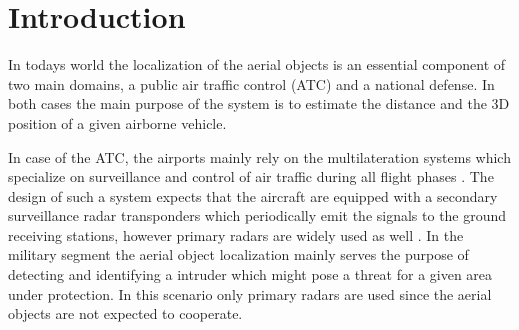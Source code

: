 

\setcounter{secnumdepth}{2}


\chapter{Introduction} \label{txt:introduction}


In todays world the localization of the aerial objects is an essential component of two main domains, a public air traffic control (ATC) and a national defense. In both cases the main purpose of the system is to estimate the distance and the 3D position of a given airborne vehicle.

In case of the ATC, the airports mainly rely on the multilateration systems which specialize on surveillance and control of air traffic during all flight phases \cite{Gaviria:newStrategiesMLAT}. The design of such a system expects that the aircraft are equipped with a secondary surveillance radar transponders which periodically emit the signals to the ground receiving stations, however primary radars are widely used as well \cite{Airtrafficmuseum}. In the military segment the aerial object localization mainly serves the purpose of detecting and identifying a intruder which might pose a threat for a given area under protection. In this scenario only primary radars are used since the aerial objects are not expected to cooperate.


